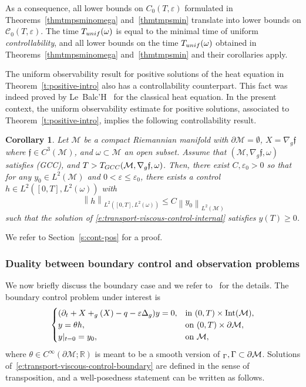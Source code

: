 \documentclass[11pt]{article}
\makeatletter
\numberwithin{equation}{section}
\newcommand{\GCC}{\textup{GCC}}
\newcommand{\pGCC}{\textup{(GCC)}\xspace}
\newcommand{\unif}{\textup{unif}}
\DeclareRobustCommand{\mathds}[1]{\csname jepbb@#1\endcsname}
\newtheorem{corollary}[lemma]{Corollary}
\theoremstyle{definition}
\newcommand{\M}{\ensuremath{\mathcal M}}
\newcommand{\calC}{\ensuremath{\mathcal C}}
\newcommand{\mb}[1]{\ensuremath{\mathbb{#1}}}
\newcommand{\R}{{\mb{R}}}
\newcommand{\f}{\ensuremath{\mathfrak{f}}}
\DeclareMathOperator{\Int}{Int}
\let \div \relax
\DeclareMathOperator{\div}{div}
\newcommand\nor[2]{\left\|#1\right\|_{#2}}
\let\d\partial
\let\e\varepsilon
\let\eps\varepsilon
\let\q q
\makeatother
\begin{document}
As a consequence, all lower bounds on $C_0(T,\eps)$ formulated in Theorems~\ref{thmtmpsminomega} and~\ref{thmtmpsmin} translate into lower bounds on $\calC_0(T,\eps)$. The time $T_{\unif}(\omega)$ is equal to the minimal time of uniform {\em controllability}, and all lower bounds on the time $T_{\unif}(\omega)$ obtained in Theorems~\ref{thmtmpsminomega} and~\ref{thmtmpsmin} and their corollaries apply.

The uniform observability result for positive solutions of the heat equation in Theorem~\ref{t:positive-intro} also has a controllability counterpart.
This fact was indeed proved by Le~Balc'H~\cite[Th.\,4.1]{L:18} for the classical heat equation.
In the present context, the uniform observability estimate for positive solutions, associated to Theorem~\ref{t:positive-intro}, implies the following controllability result.
\begin{corollary}
\label{corcontrol+}
Let $\M$ be a compact Riemannian manifold with $\d\M=\emptyset$, $X=\nabla_{g} \f$ where $\f\in C^{3}(\M)$, and $\omega\subset \M$ an open subset. Assume that $(\M, \nabla_{g} \f,\omega)$ satisfies \pGCC, and $T>T_{\GCC}(\M, \nabla_{g} \f,\omega)$. Then, there exist $C,\e_0>0$ so that for any $y_{0}\in L^{2}(\M)$ and $0<\e\leq \e_{0}$, there exists a control $h\in L^2([0,T],L^2(\omega))$ with
\[
\nor{h}{L^2([0,T],L^2(\omega))}\leq C\nor{y_{0}}{L^{2}(\M)}
\]
such that the solution of \eqref{e:transport-viscous-control-internal} satisfies $y(T)\geq0$.
\end{corollary}
We refer to Section~\ref{s:cont-pos} for a proof.

\subsubsection{Duality between boundary control and observation problems}
\label{s:boundary-shit}
We now briefly discuss the boundary case and we refer to~\cite{GL:07} for the details.
The boundary control problem under interest is
\begin{equation}
\label{e:transport-viscous-control-boundary}
\begin{cases}
(\d_t + X + \div_{g}(X) -\q - \eps \Delta_g ) y = 0, & \text{in } (0,T)\times \Int( \M), \\
y = \theta h, & \text{on } (0,T)\times \d\M, \\
y|_{t=0} = y_0, & \text{on } \M,
\end{cases}
\end{equation}
where $\theta \in C^\infty(\d\M ; \R)$ is meant to be a smooth version of $\mathds{1}_\Gamma, \Gamma \subset \d\M$.
Solutions of~\eqref{e:transport-viscous-control-boundary} are defined in the sense of transposition, and a well-posedness statement can be written as follows.
\end{document}
